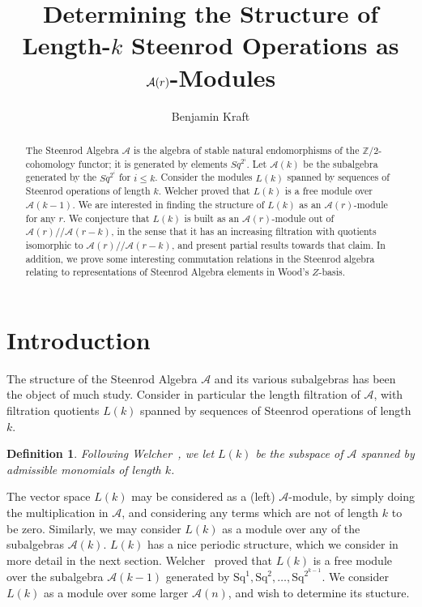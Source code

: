 \documentclass{article}
\title{Determining the Structure of Length-$k$ Steenrod Operations as $\A(r)$-Modules}
\author{Benjamin Kraft}
\newcommand{\A}{\mathcal{A}}
\newcommand{\Sq}{\mathrm{Sq}}
\newcommand{\mmod}{/\!/\!}
\newtheorem{defn}{Definition}
\begin{document}
\maketitle

\begin{abstract}
  The Steenrod Algebra $\A$ is the algebra of stable natural endomorphisms of the $\mathbb{Z}/2$-cohomology functor; it is generated by elements $Sq^{2^i}$.  Let $\A(k)$ be the subalgebra generated by the $Sq^{2^i}$ for $i\leq k$.  Consider the modules $L(k)$ spanned by sequences of Steenrod operations of length $k$.  Welcher proved that $L(k)$ is a free module over $\A(k-1)$.  We are interested in finding the structure of $L(k)$ as an $\A(r)$-module for any $r$.  We conjecture that $L(k)$ is built as an $\A(r)$-module out of $\A(r)\mmod\A(r-k)$, in the sense that it has an increasing filtration with quotients isomorphic to $\A(r)\mmod\A(r-k)$, and present partial results towards that claim.  In addition, we prove some interesting commutation relations in the Steenrod algebra relating to representations of Steenrod Algebra elements in Wood's $Z$-basis.
\end{abstract}

\section{Introduction}

The structure of the Steenrod Algebra $\A$ and its various subalgebras has been the object of much study.  Consider in particular the length filtration of $\A$, with filtration quotients $L(k)$ spanned by sequences of Steenrod operations of length $k$.

\begin{defn}
  Following Welcher~\cite{welcher}, we let $L(k)$ be the subspace of $\A$ spanned by admissible monomials of length $k$.
\end{defn}

The vector space $L(k)$ may be considered as a (left) $\A$-module, by simply doing the multiplication in $\A$, and considering any terms which are not of length $k$ to be zero.  Similarly, we may consider $L(k)$ as a module over any of the subalgebras $\A(k)$.  $L(k)$ has a nice periodic structure, which we consider in more detail in the next section.  Welcher~\cite{welcher} proved that $L(k)$ is a free module over the subalgebra $\A(k-1)$ generated by $\Sq^1, \Sq^2, \ldots, \Sq^{2^{k-1}}$.  We consider $L(k)$ as a module over some larger $\A(n)$, and wish to determine its stucture.
\end{document}
